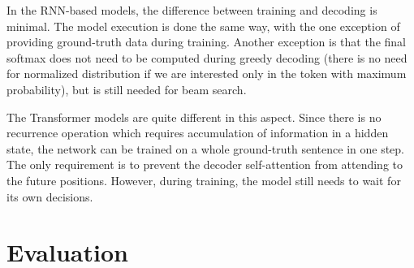 In the RNN-based models, the difference between training and decoding is minimal. The model 
execution is done the same way, with the one exception of providing ground-truth data during 
training. Another exception is that the final softmax does not need to be computed during 
greedy decoding (there is no need for normalized distribution if we are interested only in the 
token with maximum probability), but is still needed for beam search.

The Transformer models are quite different in this aspect. Since there is no recurrence operation
which requires accumulation of information in a hidden state, the network can be trained on a
whole ground-truth sentence in one step. The only requirement is to prevent the decoder 
self-attention from attending to the future positions. However, during training, the model still 
needs to wait for its own decisions.


\section{Evaluation}
\label{sec:evaluation}









\begin{markdown}

\end{markdown}
